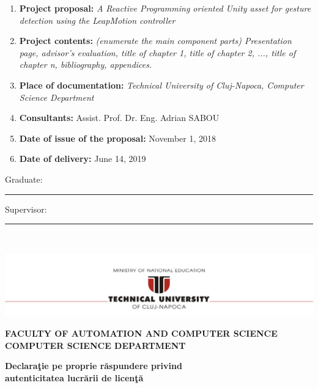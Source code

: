 \documentclass[12pt,a4paper,twoside]{report}
\renewcommand{\thesissupervisor}{Assist. Prof. Dr. Eng. Adrian SABOU}
\newcommand{\department}{\bf FACULTY OF AUTOMATION AND COMPUTER SCIENCE\\
COMPUTER SCIENCE DEPARTMENT}
\newcommand{\utcnlogo}{\includegraphics[width=15cm]{img/tucn.jpg}}
\newcommand{\uline}[1]{\rule[0pt]{#1}{0.4pt}}
\begin{document}
\vspace{1cm}

\begin{enumerate}
  \item {\bf Project proposal:} {\it A Reactive Programming oriented Unity asset for gesture detection using the LeapMotion controller}
  \item {\bf Project contents:} {\it (enumerate the main component parts) Presentation page, advisor's evaluation, title of chapter 1, title of chapter 2, ..., title of chapter n, bibliography, appendices.}
  \item {\bf Place of documentation:} {\it Technical University of Cluj-Napoca, Computer Science Department}
  \item {\bf Consultants:} \thesissupervisor{}
  \item {\bf Date of issue of the proposal:} November 1, 2018
  \item {\bf Date of  delivery:} June 14, 2019
\end{enumerate}

\vspace{1.2cm}

\hspace{6cm} Graduate: \uline{6cm} 

\vspace{0.5cm}
\hspace{6cm} Supervisor: \uline{6cm} 

\thispagestyle{empty}


\newpage
$ $


\thispagestyle{empty}
\newpage

\begin{center}
\utcnlogo

\department
\end{center}

\vspace{0.5cm}

\begin{center}
{\bf
Declara\c{t}ie pe proprie r\u{a}spundere privind\\ 
autenticitatea lucr\u{a}rii de licen\c{t}\u{a}}
\end{center}
\vspace{1cm}
\end{document}
